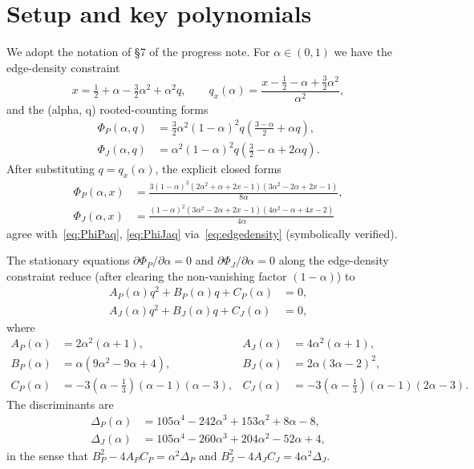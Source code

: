 \documentclass[11pt]{amsart}
\theoremstyle{definition}
\begin{document}
\section{Setup and key polynomials}

We adopt the notation of §7 of the progress note. For
\(\alpha\in(0,1)\) we have the edge-density constraint
\begin{equation}
\label{eq:edgedensity}
   x = \tfrac12 + \alpha - \tfrac32\alpha^2 + \alpha^2 q,
   \qquad
   q_x(\alpha) = \frac{x - \tfrac12 - \alpha + \tfrac32\alpha^2}{\alpha^2},
\end{equation}
and the (alpha, q) rooted-counting forms
\begin{align}
\Phi_P(\alpha, q) &= \tfrac32\alpha^2(1-\alpha)^2 q\!\left(\tfrac{3-\alpha}{2}+\alpha q\right),
\label{eq:PhiPaq}
\\
\Phi_J(\alpha, q) &= \alpha^2(1-\alpha)^2 q\!\left(\tfrac32-\alpha+2\alpha q\right).
\label{eq:PhiJaq}
\end{align}
After substituting $q = q_x(\alpha)$, the explicit closed forms
\begin{align}
\Phi_P(\alpha, x) &= \frac{3(1-\alpha)^2(2\alpha^2+\alpha+2x-1)(3\alpha^2-2\alpha+2x-1)}{8\alpha},
\label{eq:PhiPx}
\\
\Phi_J(\alpha, x) &= \frac{(1-\alpha)^2(3\alpha^2-2\alpha+2x-1)(4\alpha^2-\alpha+4x-2)}{4\alpha}
\label{eq:PhiJx}
\end{align}
agree with~\eqref{eq:PhiPaq}, \eqref{eq:PhiJaq} via~\eqref{eq:edgedensity}
(symbolically verified).

\medskip

The stationary equations $\partial \Phi_P/\partial\alpha = 0$ and
$\partial\Phi_J/\partial\alpha = 0$ along the edge-density constraint reduce
(after clearing the non-vanishing factor $(1-\alpha)$) to
\begin{align}
\label{eq:statP}
   A_P(\alpha) q^2 + B_P(\alpha) q + C_P(\alpha) &= 0,\\
\label{eq:statJ}
   A_J(\alpha) q^2 + B_J(\alpha) q + C_J(\alpha) &= 0,
\end{align}
where
\begin{align*}
A_P(\alpha) &= 2\alpha^2(\alpha+1), &
A_J(\alpha) &= 4\alpha^2(\alpha+1),
\\
B_P(\alpha) &= \alpha(9\alpha^2-9\alpha+4), &
B_J(\alpha) &= 2\alpha(3\alpha-2)^2,
\\
C_P(\alpha) &= -3(\alpha-\tfrac13)(\alpha-1)(\alpha-3), &
C_J(\alpha) &= -3(\alpha-\tfrac13)(\alpha-1)(2\alpha-3).
\end{align*}
The discriminants are
\begin{align}
\label{eq:DeltaP}
\Delta_P(\alpha) &= 105\alpha^4 - 242\alpha^3 + 153\alpha^2 + 8\alpha - 8,
\\
\label{eq:DeltaJ}
\Delta_J(\alpha) &= 105\alpha^4 - 260\alpha^3 + 204\alpha^2 - 52\alpha + 4,
\end{align}
in the sense that $B_P^2 - 4 A_P C_P = \alpha^2\Delta_P$ and
$B_J^2 - 4 A_J C_J = 4\alpha^2\Delta_J$.
\end{document}
